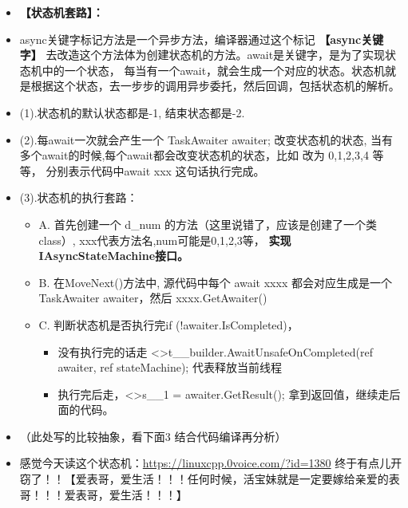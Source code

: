 \documentclass[9pt, b5paper]{article}
\begin{document}
\begin{itemize}
\item \textbf{【状态机套路】：}
\item async关键字标记方法是一个异步方法，编译器通过这个标记 \textbf{【async关键字】} 去改造这个方法体为创建状态机的方法。await是关键字，是为了实现状态机中的一个状态， 每当有一个await，就会生成一个对应的状态。状态机就是根据这个状态，去一步步的调用异步委托，然后回调，包括状态机的解析。
\item (1).状态机的默认状态都是-1, 结束状态都是-2.
\item (2).每await一次就会产生一个 TaskAwaiter awaiter; 改变状态机的状态, 当有多个await的时候,每个await都会改变状态机的状态，比如 改为 0,1,2,3,4 等等， 分别表示代码中await xxx 这句话执行完成。
\item (3).状态机的执行套路：
\begin{itemize}
\item A. 首先创建一个 d\_num 的方法（这里说错了，应该是创建了一个类 class）, xxx代表方法名,num可能是0,1,2,3等， \textbf{实现IAsyncStateMachine接口。}
\item B. 在MoveNext()方法中, 源代码中每个 await xxxx 都会对应生成是一个 TaskAwaiter awaiter，然后 xxxx.GetAwaiter()
\item C. 判断状态机是否执行完if (!awaiter.IsCompleted)，
\begin{itemize}
\item 没有执行完的话走 <>t\_\_builder.AwaitUnsafeOnCompleted(ref awaiter, ref stateMachine); 代表释放当前线程
\item 执行完后走，<>s\_\_1 = awaiter.GetResult(); 拿到返回值，继续走后面的代码。
\end{itemize}
\end{itemize}
\item （此处写的比较抽象，看下面3 结合代码编译再分析）
\item 感觉今天读这个状态机：\url{https://linuxcpp.0voice.com/?id=1380} 终于有点儿开窃了！！【爱表哥，爱生活！！！任何时候，活宝妹就是一定要嫁给亲爱的表哥！！！爱表哥，爱生活！！！】
\end{itemize}
\end{document}
